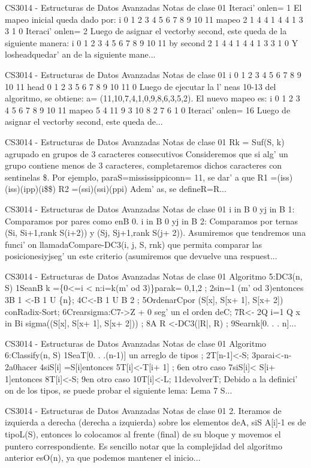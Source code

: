\begin{description}[leftmargin=!,labelwidth=4.2em,style=nextline]
\item[Pag. 6] CS3014 - Estructuras de Datos Avanzadas Notas de clase 01 Iteraci' onlen= 1 El mapeo inicial queda dado por: i 0 1 2 3 4 5 6 7 8 9 10 11 mapeo 2 1 4 4 1 4 4 1 3 3 1 0 Iteraci' onlen= 2 Luego de asignar el vectorby second, este queda de la siguiente manera: i 0 1 2 3 4 5 6 7 8 9 10 11 by second 2 1 4 4 1 4 4 1 3 3 1 0 Y losheadquedar'  an de la siguiente mane...
\item[Pag. 7] CS3014 - Estructuras de Datos Avanzadas Notas de clase 01 i 0 1 2 3 4 5 6 7 8 9 10 11 head 0 1 2 3 5 6 7 8 9 10 11 0 Luego de ejecutar la l'  neas 10-13 del algoritmo, se obtiene: a= (11,10,7,4,1,0,9,8,6,3,5,2). El nuevo mapeo es: i 0 1 2 3 4 5 6 7 8 9 10 11 mapeo 5 4 11 9 3 10 8 2 7 6 1 0 Iteraci' onlen= 16 Luego de asignar el vectorby second, este queda de...
\item[Pag. 8] CS3014 - Estructuras de Datos Avanzadas Notas de clase 01 Rk = Suf(S, k) agrupado en grupos de 3 caracteres consecutivos Consideremos que si alg' un grupo contiene menos de 3 caracteres, completaremos dichos caracteres con sentinelas \$. Por ejemplo, paraS=mississippiconn= 11, se dar'  a que R1 =(iss)(iss)(ipp)(i\$\$) R2 =(ssi)(ssi)(ppi) Adem' as, se defineR=R...
\item[Pag. 9] CS3014 - Estructuras de Datos Avanzadas Notas de clase 01 i in B 0 yj in B 1: Comparamos por pares como enB 0. i in B 0 yj in B 2: Comparamos por ternas (Si, Si+1,rank S(i+2)) y (Sj, Sj+1,rank S(j+ 2)). Asumiremos que tendremos una funci' on llamadaCompare-DC3(i, j, S, rnk) que permita comparar las posicionesiyjseg' un este criterio (asumiremos que devuelve una respuest...
\item[Pag. 10] CS3014 - Estructuras de Datos Avanzadas Notas de clase 01 Algoritmo 5:DC3(n, S) 1SeanB k =\{0<=i < n:i=k(m' od 3)\}parak= 0,1,2 ; 2sin=1 (m' od 3)entonces 3B 1 <-B 1  U  \{n\}; 4C<-B 1  U B 2 ; 5OrdenarCpor (S[x], S[x+ 1], S[x+ 2]) conRadix-Sort; 6Crearsigma:C7->Z + 0 seg' un el orden deC; 7R<- 2Q i=1 Q x in Bi sigma((S[x], S[x+ 1], S[x+ 2])) ; 8A R <-DC3(|R|, R) ; 9Searnk[0. . . n]...
\item[Pag. 11] CS3014 - Estructuras de Datos Avanzadas Notas de clase 01 Algoritmo 6:Classify(n, S) 1SeaT[0. . .(n-1)] un arreglo de tipos ; 2T[n-1]<-S; 3parai<-n-2a0hacer 4siS[i] =S[i]entonces 5T[i]<-T[i+ 1] ; 6en otro caso 7siS[i]< S[i+ 1]entonces 8T[i]<-S; 9en otro caso 10T[i]<-L; 11devolverT; Debido a la definici' on de los tipos, se puede probar el siguiente lema: Lema 7 S...
\item[Pag. 12] CS3014 - Estructuras de Datos Avanzadas Notas de clase 01 2. Iteramos de izquierda a derecha (derecha a izquierda) sobre los elementos deA, siS A[i]-1 es de tipoL(S), entonces lo colocamos al frente (final) de su bloque y movemos el puntero correspondiente. Es sencillo notar que la complejidad del algoritmo anterior esO(n), ya que podemos mantener el inicio...

\end{description}
